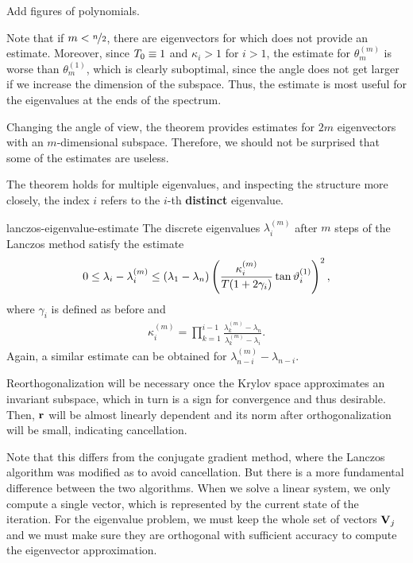 \begin{todo}
  Add figures of polynomials.
\end{todo}

\begin{remark}
  Note that if $m<\nicefrac{n}2$, there are eigenvectors for which
   does not provide an
  estimate. Moreover, since $T_0\equiv 1$ and $\kappa_i>1$
  for $i>1$, the estimate for $\theta_m^{(m)}$ is worse than
  $\theta_m^{(1)}$, which is clearly suboptimal, since the angle does
  not get larger if we increase the dimension of the subspace. Thus,
  the estimate is most useful for the eigenvalues at the ends of the
  spectrum.

  Changing the angle of view, the theorem provides estimates for $2m$
  eigenvectors with an $m$-dimensional subspace. Therefore, we should
  not be surprised that some of the estimates are useless.

  The theorem holds for multiple eigenvalues, and inspecting the
  structure more closely, the index $i$ refers to the $i$-th
  \textbf{distinct} eigenvalue.
\end{remark}

\begin{Theorem}{lanczos-eigenvalue-estimate}
  The discrete eigenvalues $\lambda_i^{(m)}$ after $m$ steps of the Lanczos method satisfy the estimate
  \begin{gather}
    0\le \lambda_i-\lambda_i^{(m)}
    \le (\lambda_1-\lambda_n) \left(
      \frac{\kappa_i^{(m)}}{T(1+2\gamma_i)}
      \tan\vartheta_i^{(1)}\right)^2,
    \end{gather}
    where $\gamma_i$ is defined as before and
    \begin{gather}
    \kappa_i^{(m)}=\prod_{k=1}^{i-1} \frac{\lambda_k^{(m)}-\lambda_n}{\lambda_k^{(m)}-\lambda_i}.
  \end{gather}
  Again, a similar estimate can be obtained for $\lambda_{n-i}^{(m)} - \lambda_{n-i}$.
\end{Theorem}

\begin{remark}
  Reorthogonalization will be necessary once the Krylov space
  approximates an invariant subspace, which in turn is a sign for
  convergence and thus desirable. Then, $\mathbf r$ will be almost linearly
  dependent and its norm after orthogonalization will be small,
  indicating cancellation.

  Note that this differs from the conjugate gradient method, where the
  Lanczos algorithm was modified as to avoid cancellation. But there
  is a more fundamental difference between the two algorithms. When we
  solve a linear system, we only compute a single vector, which is
  represented by the current state of the iteration. For the
  eigenvalue problem, we must keep the whole set of vectors $\mathbf V_j$
  and we must make sure they are orthogonal with sufficient accuracy
  to compute the eigenvector approximation.
\end{remark}

